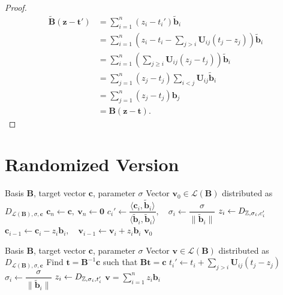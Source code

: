 \begin{proof}
	\begin{align*}
		\mathbf{\tilde B}(\mathbf{z} - \mathbf{t}')
		&= \sum_{i=1}^n (z_i - t_i') \mathbf{\tilde b}_i \\
		&= \sum_{i=1}^n \left( z_i - t_i - \sum_{j>i} \mathbf{U}_{ij} (t_j - z_j) \right) \mathbf{\tilde b}_i \\
		&= \sum_{i=1}^n \left( \sum_{j \geq i} \mathbf{U}_{ij} (z_j - t_j) \right) \mathbf{\tilde b}_i \\
		&= \sum_{j=1}^n (z_j - t_j) \sum_{i < j} \mathbf{U}_{ij} \mathbf{\tilde b}_i \\
		&= \sum_{j=1}^n (z_j - t_j) \mathbf{b}_j \\
		&= \mathbf{B}(\mathbf{z} - \mathbf{t}).
	\end{align*}
\end{proof}

\section{Randomized Version~\cite{GPV08}}

\begin{algorithm}[H]
	\caption{Randomized Nearest-Plane (Discrete Gaussian Sampler)}
	\label{alg:randomized-gpv}
	\begin{algorithmic}[1]
		\Require Basis $\mathbf{B}$, target vector $\mathbf{c}$, parameter $\sigma$
		\Ensure Vector $\mathbf{v}_0 \in \mathcal{L}(\mathbf{B})$ distributed as $D_{\mathcal{L}(\mathbf{B}), \sigma, \mathbf{c}}$
		\State $\mathbf{c}_n \gets \mathbf{c}, \ \mathbf{v}_n \gets \mathbf{0}$
			\State $c_i' \gets \dfrac{\langle \mathbf{c}_i, \mathbf{\tilde b}_i \rangle}{\langle \mathbf{\tilde b}_i, \mathbf{\tilde b}_i \rangle}, \quad \sigma_i \gets \dfrac{\sigma}{\|\mathbf{\tilde b}_i\|}$
			\State $z_i \gets D_{\mathbb{Z}, \sigma_i, c_i'}$
			\State $\mathbf{c}_{i-1} \gets \mathbf{c}_i - z_i \mathbf{b}_i, \quad \mathbf{v}_{i-1} \gets \mathbf{v}_i + z_i \mathbf{b}_i$
		\EndFor
		\State \Return $\mathbf{v}_0$
	\end{algorithmic}
\end{algorithm}

\begin{algorithm}[H]
	\caption{Randomized Nearest-Plane via $\mathbf{U}$}
	\label{alg:randomized-gpv-u}
	\begin{algorithmic}[1]
		\Require Basis $\mathbf{B}$, target vector $\mathbf{c}$, parameter $\sigma$
		\Ensure Vector $\mathbf{v} \in \mathcal{L}(\mathbf{B})$ distributed as $D_{\mathcal{L}(\mathbf{B}), \sigma, \mathbf{c}}$
		\State Find $\mathbf{t} = \mathbf{B}^{-1}\mathbf{c}$ such that $\mathbf{B}\mathbf{t} = \mathbf{c}$
			\State $t_i' \gets t_i + \sum_{j > i} \mathbf{U}_{ij} (t_j - z_j)$
			\State $\sigma_i \gets \dfrac{\sigma}{\|\mathbf{\tilde b}_i\|}$
			\State $z_i \gets D_{\mathbb{Z}, \sigma_i, t_i'}$
		\EndFor
		\State \Return $\mathbf{v} = \sum_{i=1}^n z_i \mathbf{b}_i$
	\end{algorithmic}
\end{algorithm}

